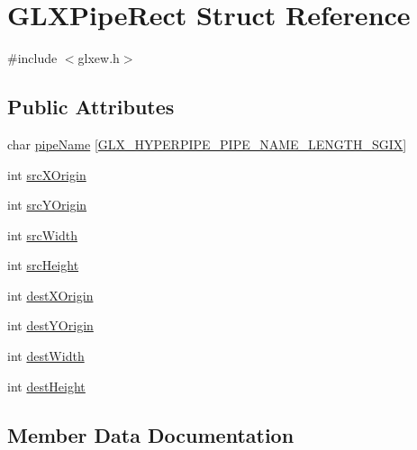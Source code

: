 \hypertarget{struct_g_l_x_pipe_rect}{}\section{G\+L\+X\+Pipe\+Rect Struct Reference}
\label{struct_g_l_x_pipe_rect}


{\ttfamily \#include $<$glxew.\+h$>$}

\subsection*{Public Attributes}
\begin{DoxyCompactItemize}
\item 
char \mbox{\hyperlink{struct_g_l_x_pipe_rect_aa4c4f60e9647705ddefa10f95a37cb79}{pipe\+Name}} \mbox{[}\mbox{\hyperlink{glxew_8h_ae1c8261c0861010d8003a31d07e26005}{G\+L\+X\+\_\+\+H\+Y\+P\+E\+R\+P\+I\+P\+E\+\_\+\+P\+I\+P\+E\+\_\+\+N\+A\+M\+E\+\_\+\+L\+E\+N\+G\+T\+H\+\_\+\+S\+G\+IX}}\mbox{]}
\item 
int \mbox{\hyperlink{struct_g_l_x_pipe_rect_a9df2313c01f75d149e64f2ff467bc266}{src\+X\+Origin}}
\item 
int \mbox{\hyperlink{struct_g_l_x_pipe_rect_a1f7316dff7050ab2ce9d3d37f8c5450e}{src\+Y\+Origin}}
\item 
int \mbox{\hyperlink{struct_g_l_x_pipe_rect_a2c6c180a4dabb71076366e06a1c7d0ef}{src\+Width}}
\item 
int \mbox{\hyperlink{struct_g_l_x_pipe_rect_a35632524bce6bffa05f284a9b1c1b8ff}{src\+Height}}
\item 
int \mbox{\hyperlink{struct_g_l_x_pipe_rect_a8b7b941894ad3420326d7e9fa885bb71}{dest\+X\+Origin}}
\item 
int \mbox{\hyperlink{struct_g_l_x_pipe_rect_aef7766b02ef07c20a11e89da5878b469}{dest\+Y\+Origin}}
\item 
int \mbox{\hyperlink{struct_g_l_x_pipe_rect_a3c07991d2a8fb6e973eae834650b3dad}{dest\+Width}}
\item 
int \mbox{\hyperlink{struct_g_l_x_pipe_rect_a858b0ea6642e451495aff35cfefbd083}{dest\+Height}}
\end{DoxyCompactItemize}


\subsection{Member Data Documentation}
\mbox{\label{struct_g_l_x_pipe_rect_a858b0ea6642e451495aff35cfefbd083}} 
